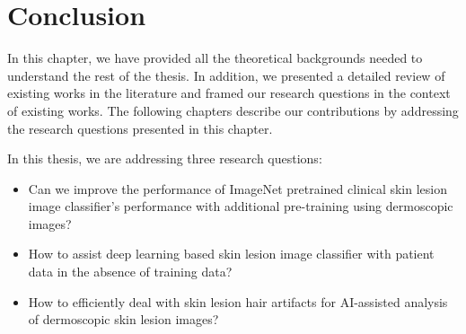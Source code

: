 \section{Conclusion}
In this chapter, we have provided all the theoretical backgrounds needed to understand the rest of the thesis. In addition, we presented a detailed review of existing works in the literature and framed our research questions in the context of existing works. The following chapters describe our contributions by addressing the research questions presented in this chapter. 
\begin{tcolorbox}[enhanced,attach boxed title to top center={yshift=-3mm,yshifttext=-1mm},
	coltitle=black, colback=blue!5!white,colframe=blue!75!black,colbacktitle=violet!50!white,
	title=Key Points (Chapter \ref{chap:background}),fonttitle=\bfseries,
	boxed title style={colframe=black} ]
	In this thesis, we are addressing three research questions:
	\begin{itemize}
		\item Can we improve the performance of ImageNet pretrained clinical skin lesion image classifier's performance with additional pre-training using dermoscopic images?
		\item How to assist deep learning based skin lesion image classifier with patient data in the absence of training data?
		\item How to efficiently deal with skin lesion hair artifacts for AI-assisted analysis of dermoscopic skin lesion images?
	\end{itemize}
\end{tcolorbox}
